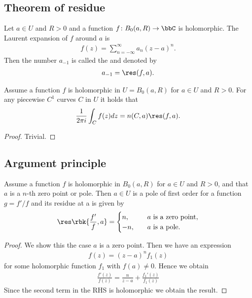 \documentclass[openany, a4paper, oneside]{jsbook}
\begin{document}
\subsection{Theorem of residue}

\begin{defn}
 Let $a \in U$ and $R > 0$ and a function $f \colon B_0 (a, R) \to \bbC$ is holomorphic.
 The Laurent expansion of $f$ around $a$ is
 \begin{align}
  f (z)
  =
  \sum_{n= - \infty}^{\infty} a_n (z - a)^n.
 \end{align}
 Then the number $a_{-1}$ is called the  and denoted by
 \begin{align}
  a_{-1}
  =
  \res (f, a).
 \end{align}
\end{defn}
\begin{thm}
 Assume a function $f$ is holomorphic in $U = B_0 (a, R)$ for $a \in U$ and $R > 0$.
 For any piecewise $C^1$ curves $C$ in $U$ it holds that
 \begin{align}
  \frac{1}{2 \pi i} \int_C f (z) dz
  =
  n (C, a) \res (f, a).
 \end{align}
\end{thm}
\begin{proof}
 Trivial.
\end{proof}
\subsection{Argument principle}

\begin{prop}
 Assume a function $f$ is holomorphic in $B_0 (a, R)$ for $a \in U$ and $R > 0$,
 and that $a$ is a $n$-th zero point or pole.
 Then $a \in U$ is a pole of first order for a function $g = f'/f$ and its residue at a is given by
 \begin{align}
  \res \rbk{\frac{f'}{f}, a}
  =
  \begin{cases}
   n, &\quad a \text{ is a zero point}, \\
   -n, &\quad a \text{ is a pole}.
  \end{cases}
 \end{align}
\end{prop}
\begin{proof}
We show this the case $a$ is a zero point.
Then we have an expression
\begin{align}
 f (z)
 =
 (z - a)^n f_1 (z)
\end{align}
for some holomorphic function $f_1$ with $f (a) \neq 0$.
Hence we obtain
\begin{align}
 \frac{f'(z)}{f (z)}
 =
 \frac{n}{z - a} + \frac{f_1'(z)}{f_1 (z)}
\end{align}
Since the second term in the RHS is holomorphic we obtain the result.
\end{proof}
\end{document}
